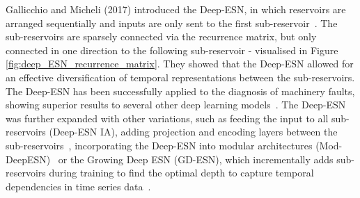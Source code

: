 Gallicchio and Micheli (2017) introduced the Deep-ESN, in which reservoirs are arranged sequentially and inputs are only sent to the first sub-reservoir~\cite{gallicchio_and_micheli_2017}. The sub-reservoirs are sparsely connected via the recurrence matrix, but only connected in one direction to the following sub-reservoir - visualised in Figure \ref{fig:deep_ESN_recurrence_matrix}. They showed that the Deep-ESN allowed for an effective diversification of temporal representations between the sub-reservoirs. The Deep-ESN has been successfully applied to the diagnosis of machinery faults, showing superior results to several other deep learning models~\cite{long_2020}. The Deep-ESN was further expanded with other variations, such as feeding the input to all sub-reservoirs (Deep-ESN IA), adding projection and encoding layers between the sub-reservoirs~\cite{ma_2017}, incorporating the Deep-ESN into modular architectures (Mod-DeepESN)~\cite{carmichael_2018} or the Growing Deep ESN (GD-ESN), which incrementally adds sub-reservoirs during training to find the optimal depth to capture temporal dependencies in time series data~\cite{li_2022}.

